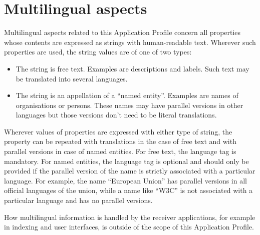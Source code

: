 
\section{Multilingual aspects}
\label{ariaid-title14}

Multilingual aspects related to this Application Profile concern all
properties whose contents are expressed as strings with human-readable
text. Wherever such properties are used, the string values are of one of
two types:

\begin{itemize}
\item
  The string is free text. Examples are descriptions and labels. Such
  text may be translated into several languages.
\item
  The string is an appellation of a ``named entity''. Examples are names
  of organisations or persons. These names may have parallel versions in
  other languages but those versions don't need to be literal
  translations.
\end{itemize}

Wherever values of properties are expressed with either type of string,
the property can be repeated with translations in the case of free text
and with parallel versions in case of named entities. For free text, the
language tag is mandatory. For named entities, the language tag is
optional and should only be provided if the parallel version of the name
is strictly associated with a particular language. For example, the name
``European Union'' has parallel versions in all official languages of the
union, while a name like ``W3C'' is not associated with a particular
language and has no parallel versions.

How multilingual information is handled by the receiver applications,
for example in indexing and user interfaces, is outside of the scope of
this Application Profile.
